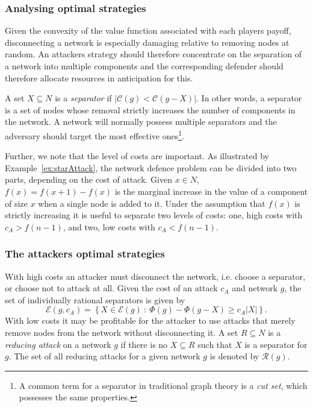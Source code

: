 \documentclass[11pt,fleqn]{article}
\begin{document}
\subsubsection{Analysing optimal strategies}

Given the convexity of the value function associated with each players payoff, disconnecting a network is especially damaging relative to removing nodes at random. An attackers strategy should therefore concentrate on the separation of a network into multiple components and the corresponding defender should therefore allocate resources in anticipation for this.

A set $X \subseteq N$ is a \emph{separator} if $| \mathcal{C}(g) < \mathcal{C}(g - X) |$. In other words, a separator is a set of nodes whose removal strictly increases the number of components in the network. A network will normally possess multiple separators and the adversary should target the most effective ones\footnote{A common term for a separator in traditional graph theory is a \emph{cut set}, which possesses the same properties.}.

Further, we note that the level of costs are important. As illustrated by Example~\ref{ex:starAttack}, the network defence problem can be divided into two parts, depending on the cost of attack. Given $x \in N$, $f(x) = f(x + 1) - f(x)$ is the marginal increase in the value of a component of size $x$ when a single node is added to it. Under the assumption that $f(x)$ is strictly increasing it is useful to separate two levels of costs: one, high costs with $c_{A} > f(n - 1)$, and two,
low costs with $c_{A} < f(n - 1)$.

\subsubsection{The attackers optimal strategies}

With high costs an attacker must disconnect the network, i.e. choose a separator, or choose not to attack at all. Given the cost of an attack $c_{A}$ and network $g$, the set of individually rational separators is given by
\begin{equation}
  \mathcal{E}(g, c_{A}) = \left\{ X \in \mathcal{E}(g) ~ : ~ \Phi(g) - \Phi(g - X) \geq c_{A} |X| \right\}.
\end{equation}
With low costs it may be profitable for the attacker to use attacks that merely remove nodes from the network without disconnecting it. A set $R \subseteq N$ is a \emph{reducing attack} on a network $g$ if there is no $X \subseteq R$ such that $X$ is a separator for $g$. The set of all reducing attacks for a given network $g$ is denoted by $\mathcal{R}(g)$.
\end{document}
